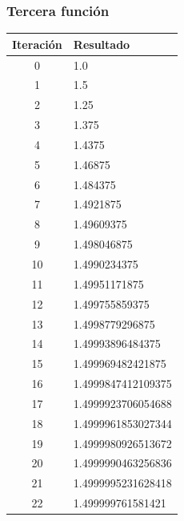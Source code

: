 \documentclass[titlepage,a4paper]{article}
\begin{document}
\subsubsection{Tercera función}\label{sec:bis3}
\begin{multicols}{2}
\begin{center}
    \begin{tabular}{| c | l |}
    \hline
     Iteración & Resultado \\ \hline
 0     &  1.0 \\
1     &  1.5 \\
2     &  1.25 \\
3     &  1.375 \\
4     &  1.4375 \\
5     &  1.46875 \\
6     &  1.484375 \\
7     &  1.4921875 \\
8     &  1.49609375 \\
9     &  1.498046875 \\
10     &  1.4990234375 \\
11     &  1.49951171875 \\
12     &  1.499755859375 \\
13     &  1.4998779296875 \\
14     &  1.49993896484375 \\
15     &  1.499969482421875 \\
16     &  1.4999847412109375 \\
17     &  1.4999923706054688 \\
18     &  1.4999961853027344 \\
19     &  1.4999980926513672 \\
20     &  1.4999990463256836 \\
21     &  1.4999995231628418 \\
22     &  1.499999761581421 \\



\end{tabular}
\end{center}
\end{multicols}
\end{document}
